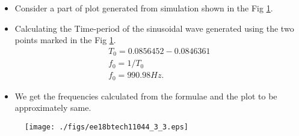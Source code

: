 \begin{enumerate}[label=\thesubsection.\arabic*.,ref=\thesubsection.\theenumi]
 \solution
 \begin{itemize}
     \item Consider a part of plot generated from simulation shown in the Fig \ref{fig:ee18btech11044_3_plot_3}.
     \item Calculating the Time-period of the sinusoidal wave generated using the two points marked in the Fig \ref{fig:ee18btech11044_3_plot_3}.
     \begin{align}
         T_0 = 0.0856452 - 0.0846361 \\
         f_0 = 1/T_0 \\
         f_0 = 990.98Hz.
     \end{align}
     \item We get the frequencies calculated from the formulae and the plot to be approximately same.
 \end{itemize}
 
 
 \begin{figure}[!ht]
\centering
\texttt{[image: ./figs/ee18btech11044\_3\_3.eps]}
\caption{}
\label{fig:ee18btech11044_3_plot_3}
\end{figure}
\end{enumerate}
